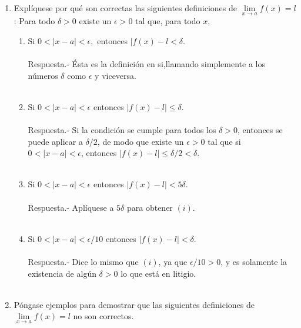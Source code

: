 \begin{enumerate}
\item Explíquese por qué son correctas las siguientes definiciones de $\lim\limits_{x\to a}f(x)=l$: Para todo $\delta>0$ existe un $\epsilon>0$ tal que, para todo $x$,
\begin{enumerate}[\bfseries (i)]

    \item Si $0<|x-a|<\epsilon,$ entonces $|f(x)-l<\delta$.\\\\
	Respuesta.-\; Ésta es la definición en si,llamando simplemente a los números $\delta$ como $\epsilon$ y viceversa.\\\\

    \item Si $0<|x-a|<\epsilon$ entonces $|f(x)-l| \leq \delta$.\\\\
	Respuesta.-\; Si la condición se cumple para todos los $\delta>0$, entonces se puede aplicar a $\delta/2$, de modo que existe un $\epsilon>0$ tal que si $0<|x-a|<\epsilon$, entonces $|f(x)-l|\leq \delta/2<\delta$.\\\\

    \item Si $0<|x-a|<\epsilon$ entonces $|f(x)-l| < 5\delta$.\\\\
	Respuesta.-\; Aplíquese a $5\delta$ para obtener $(i)$.\\\\

    \item Si $0<|x-a|<\epsilon/10$ entonces $|f(x)-l| < \delta$.\\\\
	Respuesta.-\; Dice lo mismo que $(i)$, ya que $\epsilon/10>0$, y es solamente la existencia de algún $\delta>0$ lo que está en litigio.\\\\

\end{enumerate}

\item Póngase ejemplos para demostrar que las siguientes definiciones de $\lim\limits_{x\to a} f(x) = l$ no son correctos.
\begin{enumerate}[\bfseries (a)]
    

\end{enumerate}
\end{enumerate}
